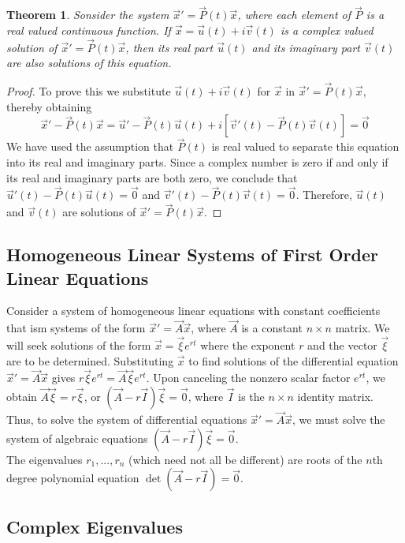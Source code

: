 \documentclass[10pt]{report}
\newtheorem{thm3}{Theorem}[subsection]
\begin{document}
\begin{thm3}
Sonsider the system $\vec{x}' = \vec{P}(t)\vec{x}$, where each element of $\vec{P}$ is a real valued continuous function. If $\vec{x}=\vec{u}(t) + i\vec{v}(t)$ is a complex valued solution of $\vec{x}' = \vec{P}(t)\vec{x}$, then its real part $\vec{u}(t)$ and its imaginary part $\vec{v}(t)$ are also solutions of this equation.
\end{thm3}
\begin{proof}
To prove this we substitute $\vec{u}(t)+i\vec{v}(t)$ for $\vec{x}$ in $\vec{x}' = \vec{P}(t)\vec{x}$, thereby obtaining
$$\vec{x}'-\vec{P}(t)\vec{x} = \vec{u}'-\vec{P}(t)\vec{u}(t)+i[\vec{v}'(t)-\vec{P}(t)\vec{v}(t)]=\vec{0}$$
We have used the assumption that $\vec{P}(t)$ is real valued to separate this equation into its real and imaginary parts. Since a complex number is zero if and only if its real and imaginary parts are both zero, we conclude that $\vec{u}'(t)-\vec{P}(t)\vec{u}(t)=\vec{0}$ and $\vec{v}'(t)-\vec{P}(t)\vec{v}(t)=\vec{0}$. Therefore, $\vec{u}(t)$ and $\vec{v}(t)$ are solutions of $\vec{x}' = \vec{P}(t)\vec{x}$.
\end{proof}
\subsection{Homogeneous Linear Systems of First Order Linear Equations}
Consider a system of homogeneous linear equations with constant coefficients that ism systems of the form $\vec{x}' = \vec{A}\vec{x}$, where $\vec{A}$ is a constant $n\times n$ matrix. We will seek solutions of the form $\vec{x} = \vec{\xi}e^{rt}$ where the exponent $r$ and the vector $\vec{\xi}$ are to be determined. Substituting $\vec{x}$ to find solutions of the differential equation $\vec{x}' = \vec{A}\vec{x}$ gives $r\vec{\xi}e^{rt} = \vec{A}\vec{\xi}e^{rt}$. Upon canceling the nonzero scalar factor $e^{rt}$, we obtain $\vec{A}\vec{\xi} = r\vec{\xi}$, or $(\vec{A} - r\vec{I})\vec{\xi}=\vec{0}$, where $\vec{I}$ is the $n\times n$ identity matrix. Thus, to solve the system of differential equations $\vec{x}' = \vec{A}\vec{x}$, we must solve the system of algebraic equations $(\vec{A} - r\vec{I})\vec{\xi}=\vec{0}$.\\
The eigenvalues $r_1,...,r_n$ (which need not all be different) are roots of the $n$th degree polynomial equation $\det(\vec{A}-r\vec{I})=\vec{0}$.
\subsection{Complex Eigenvalues}
\end{document}
